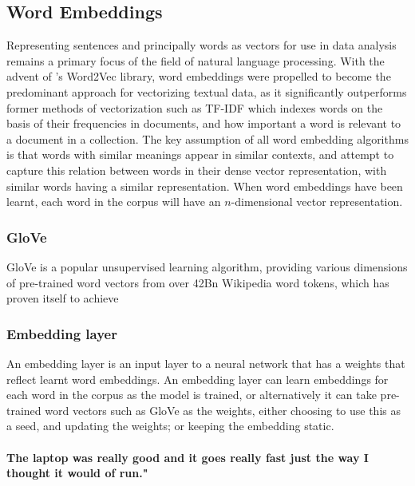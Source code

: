 \subsection{Word Embeddings}
Representing sentences and principally words as vectors for use in data analysis remains a primary focus of the field of natural language processing. With the advent of  \textcolor{cite}{\cite{mikolov}}'s Word2Vec library, word embeddings were propelled to become the predominant approach for vectorizing textual data, as it significantly outperforms former methods of vectorization such as TF-IDF which indexes words on the basis of their frequencies in documents, and how important a word is relevant to a document in a collection. 
\newline\newline
The key assumption of all word embedding algorithms is that words with similar meanings appear in similar contexts, and attempt to capture this relation between words in their dense vector representation, with similar words having a similar representation. When word embeddings have been learnt, each word in the corpus will have an $n$-dimensional vector representation. 

\subsubsection{GloVe}

GloVe \textcolor{cite}{\cite{glove}} is a popular unsupervised learning algorithm, providing various dimensions of pre-trained word vectors from over 42Bn Wikipedia word tokens, which has proven itself to achieve 

\subsubsection{Embedding layer}
An embedding layer is an input layer to a neural network that has a weights that reflect learnt word embeddings. An embedding layer can learn embeddings for each word in the corpus as the model is trained, or alternatively it can take pre-trained word vectors such as GloVe as the weights, either choosing to use this as a seed, and updating the weights; or keeping the embedding static.

\newline

\paragraph{The laptop was really good and it goes really fast just the way I thought it would of run."}


